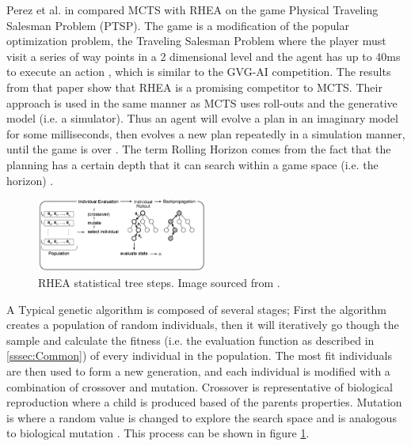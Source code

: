 \documentclass[journal]{IEEEtran}
\begin{document}
			Perez et al. in \cite{perez2013rolling} compared MCTS with RHEA on the game Physical Traveling Salesman Problem (PTSP). 
			The game is a modification of the popular optimization problem, the Traveling Salesman Problem \cite{perez2014solving, flood1956traveling} where the player must visit a series of way points in a 2 dimensional level and the agent has up to 40ms to execute an action \cite{perez2013rolling}, which is similar to the GVG-AI competition.  The results from that paper show that RHEA is a promising competitor to MCTS.
			Their approach is used in the same manner as MCTS uses roll-outs and the generative model (i.e. a simulator). Thus an agent will evolve a plan in an imaginary model for some milliseconds, then evolves a new plan repeatedly in a simulation manner, until the game is over \cite{perez2013rolling}.
			The term Rolling Horizon comes from the fact  that the planning has a certain depth that it can search within a game space  (i.e. the horizon) \cite{gaina2017analysis, gaina2017rolling}.
			
			
			\begin{figure}[h]
		   		 \centering
		   		 \includegraphics[width=0.5\textwidth]{RHEArollout}
		    		 \caption{RHEA statistical tree steps. Image sourced from \cite{gaina2017rolling}. }
		  		 \label{fig:RHEArollout}
			\end{figure}
			
			A Typical genetic algorithm is composed of several stages;
			First the algorithm creates a population of random individuals, then it will iteratively go though the sample and calculate the fitness (i.e. the evaluation function as described in \ref{sssec:Common}) of every individual in the population. 
			The most fit individuals are then used to form a new generation, and each individual is modified with a combination of crossover and mutation. 
			Crossover is representative of biological reproduction where a child is produced based of the parents properties. Mutation is where a random value is changed to explore the search space and is analogous to biological mutation \cite{back1996evolutionary, vcrepinvsek2013exploration, perez2013rolling, gaina2017rolling, gaina2017analysis}.
			This process can be shown in figure \ref{fig:RHEArollout}.
			
\end{document}
